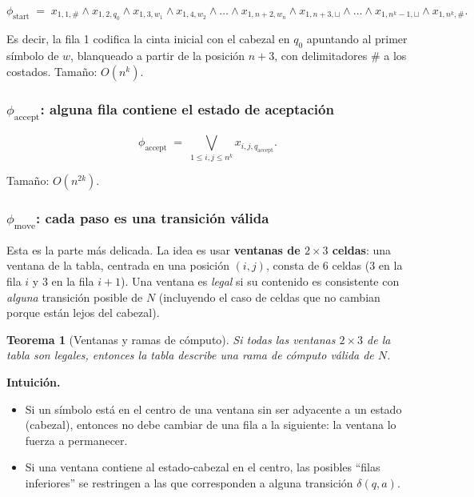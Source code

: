 \documentclass[11pt,a4paper]{article}
\theoremstyle{definicion}
\newtheorem{teorema}[definicion]{Teorema}
\begin{document}
\[
\phi_{\text{start}} \;=\; x_{1,1,\#} \land x_{1,2,q_0} \land x_{1,3,w_1} \land x_{1,4,w_2} \land \dots \land x_{1,n+2,w_n} \land x_{1,n+3,\sqcup} \land \dots \land x_{1,n^k - 1, \sqcup} \land x_{1, n^k, \#}.
\]

Es decir, la fila 1 codifica la cinta inicial con el cabezal en $q_0$ apuntando al primer símbolo de $w$, blanqueado a partir de la posición $n+3$, con delimitadores $\#$ a los costados. Tamaño: $O(n^k)$.

\subsubsection*{$\phi_{\text{accept}}$: alguna fila contiene el estado de aceptación}

\[
\phi_{\text{accept}} \;=\; \bigvee_{1 \leq i, j \leq n^k} x_{i, j, q_{\text{accept}}}.
\]

Tamaño: $O(n^{2k})$.

\subsubsection*{$\phi_{\text{move}}$: cada paso es una transición válida}

Esta es la parte más delicada. La idea es usar \textbf{ventanas de $2 \times 3$ celdas}: una ventana de la tabla, centrada en una posición $(i, j)$, consta de 6 celdas (3 en la fila $i$ y 3 en la fila $i+1$). Una ventana es \emph{legal} si su contenido es consistente con \emph{alguna} transición posible de $N$ (incluyendo el caso de celdas que no cambian porque están lejos del cabezal).

\begin{teorema}[Ventanas y ramas de cómputo]
Si todas las ventanas $2 \times 3$ de la tabla son legales, entonces la tabla describe una rama de cómputo válida de $N$.
\end{teorema}

\textbf{Intuición.}\quad
\begin{itemize}
    \item Si un símbolo está en el centro de una ventana sin ser adyacente a un estado (cabezal), entonces no debe cambiar de una fila a la siguiente: la ventana lo fuerza a permanecer.
    \item Si una ventana contiene al estado-cabezal en el centro, las posibles ``filas inferiores'' se restringen a las que corresponden a alguna transición $\delta(q, a)$.
\end{itemize}
\end{document}
